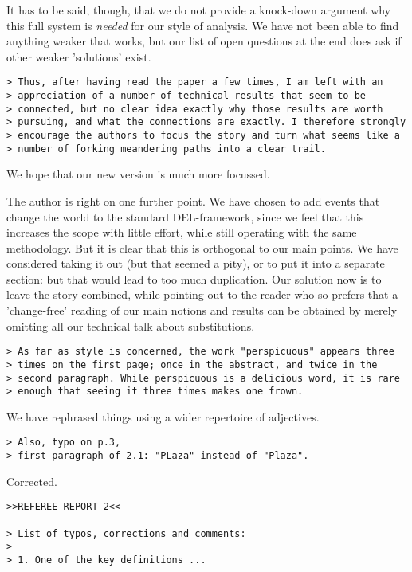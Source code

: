 \documentclass{article}
\begin{document}
It has to be said, though, that we do not provide a knock-down argument
why this full system is {\em needed} for our style of analysis. We have
not been able to find anything weaker that works, but our list of
open questions at the end does ask if other weaker 'solutions' exist.

\begin{verbatim} 
> Thus, after having read the paper a few times, I am left with an
> appreciation of a number of technical results that seem to be
> connected, but no clear idea exactly why those results are worth
> pursuing, and what the connections are exactly. I therefore strongly
> encourage the authors to focus the story and turn what seems like a
> number of forking meandering paths into a clear trail.
\end{verbatim}

We hope that our new version is much more focussed.

The author is right on one further point. We have chosen to add
events that change the world to the standard DEL-framework, since
we feel that this increases the scope with little effort, while
still operating with the same methodology. But it is clear that
this is orthogonal to our main points. We have considered taking
it out (but that seemed a pity), or to put it into a separate
section: but that would lead to too much duplication. Our solution
now is to leave the story combined, while pointing out to the reader
who so prefers that a 'change-free' reading of our main notions and
results can be obtained by merely omitting all our technical talk
about substitutions.

\begin{verbatim}
> As far as style is concerned, the work "perspicuous" appears three
> times on the first page; once in the abstract, and twice in the
> second paragraph. While perspicuous is a delicious word, it is rare
> enough that seeing it three times makes one frown.
\end{verbatim} 

We have rephrased things using a wider repertoire of adjectives.

\begin{verbatim}
> Also, typo on p.3,
> first paragraph of 2.1: "PLaza" instead of "Plaza".
\end{verbatim}

Corrected.

\begin{verbatim} 
>>REFEREE REPORT 2<<

> List of typos, corrections and comments:
>
> 1. One of the key definitions ...
\end{verbatim}
\end{document}
